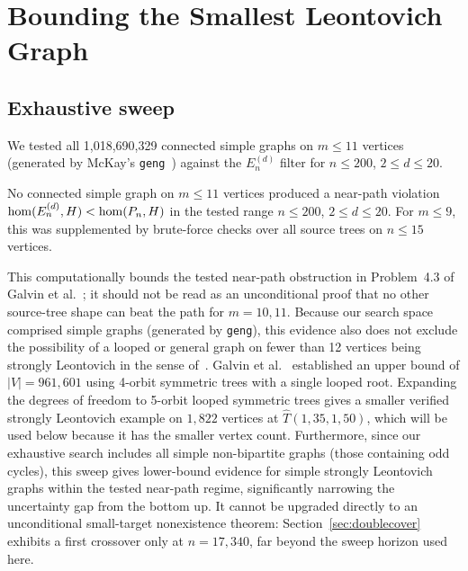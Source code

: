 \section{Bounding the Smallest Leontovich Graph}
\label{sec:bounds}

\subsection{Exhaustive sweep}

We tested all 1,018,690,329 connected simple graphs on $m \le 11$
vertices~\cite{oeis_A001349} (generated by McKay's
\texttt{geng}~\cite{mckay2014practical}) against the
$E_n^{(d)}$ filter for $n \le 200$, $2 \le d \le 20$.

\begin{compresult}
  No connected simple graph on $m \le 11$ vertices produced a near-path
  violation $\mathrm{hom}(E_n^{(d)},H)<\mathrm{hom}(P_n,H)$ in the tested range
  $n \le 200$, $2 \le d \le 20$. For $m \le 9$, this was supplemented by
  brute-force checks over all source trees on $n \le 15$ vertices.
\end{compresult}

This computationally bounds the tested near-path obstruction in
Problem~4.3 of Galvin et al.~\cite{galvin2025}; it should not be read as an
unconditional proof that no other source-tree shape can beat the path for
$m=10,11$. Because our search space comprised simple graphs (generated by
\texttt{geng}), this evidence also does not exclude the possibility of a
looped or general graph on fewer than 12 vertices being strongly Leontovich
in the sense of~\cite{galvin2026}.
Galvin et al.~\cite{galvin2025} established an upper bound of
$|V| = 961{,}601$ using 4-orbit symmetric trees with a single looped
root. Expanding the degrees of freedom to 5-orbit looped symmetric trees
gives a smaller verified strongly Leontovich example on $1{,}822$ vertices
at $\hat{T}(1, 35, 1, 50)$, which will be used below because it has the
smaller vertex count. Furthermore, since our exhaustive search
includes all simple non-bipartite graphs (those containing odd cycles), this
sweep gives lower-bound evidence for simple strongly Leontovich graphs within
the tested near-path regime, significantly narrowing the uncertainty gap from
the bottom up. It cannot be upgraded directly to an unconditional small-target
nonexistence theorem: Section~\ref{sec:doublecover} exhibits a first crossover
only at $n = 17{,}340$, far beyond the sweep horizon used here.


